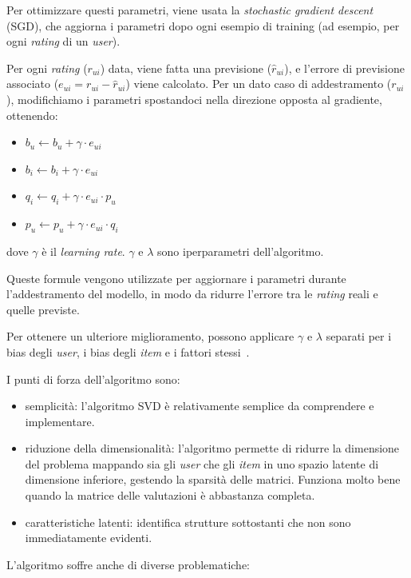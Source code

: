 Per ottimizzare questi parametri, viene usata la \textit{stochastic gradient descent} (SGD), che aggiorna i parametri dopo ogni  esempio di training (ad esempio, per ogni \textit{rating} di un \textit{user}).

Per ogni \textit{rating} ($r_{ui}$) data, viene fatta una previsione ($\hat{r}_{ui}$), e l'errore di previsione associato ($e_{ui} = r_{ui} - \hat{r}_{ui}$) viene calcolato. Per un dato caso di addestramento ($r_{ui}$), modifichiamo i parametri spostandoci nella
direzione opposta al gradiente, ottenendo:

\begin{itemize}
    \item $b_u \leftarrow b_u + \gamma \cdot e_{ui}$
    \item $b_i \leftarrow b_i + \gamma \cdot e_{ui}$
    \item $q_i \leftarrow q_i + \gamma \cdot e_{ui} \cdot p_u$
    \item $p_u \leftarrow p_u + \gamma \cdot e_{ui} \cdot q_i$
\end{itemize}

dove $\gamma$ è il \textit{learning rate}. $\gamma$ e $\lambda$ sono iperparametri dell'algoritmo.

Queste formule vengono utilizzate per aggiornare i parametri durante l'addestramento del modello, in modo da ridurre l'errore tra le
\textit{rating} reali e quelle previste.

Per ottenere un ulteriore miglioramento, possono applicare $\gamma$ e $\lambda$ separati per i bias degli \textit{user}, i bias degli
\textit{item} e i fattori stessi~\cite{SVD_optimized}.

I punti di forza dell'algoritmo sono:

\begin{itemize}
    \item semplicità: l'algoritmo SVD è relativamente semplice da comprendere e implementare.
    \item riduzione della dimensionalità: l'algoritmo permette di ridurre la dimensione del problema mappando sia gli \textit{user} che gli \textit{item} in uno spazio latente di dimensione inferiore, gestendo la sparsità delle matrici. Funziona molto bene quando la matrice delle valutazioni è abbastanza completa. 
    \item caratteristiche latenti: identifica strutture sottostanti che non sono immediatamente evidenti.
\end{itemize}

L'algoritmo soffre anche di diverse problematiche:

